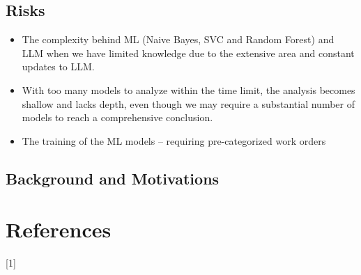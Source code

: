 \documentclass{article}
\begin{document}
\subsection{Risks}

\begin{itemize}
      \item The complexity behind ML (Naive Bayes, SVC and Random Forest) and LLM when
            we have limited knowledge due to the extensive area and constant updates to LLM.
      \item With too many models to analyze within the time limit, the analysis becomes
            shallow and lacks depth, even though we may require a substantial number of models
            to reach a comprehensive conclusion.
      \item The training of the ML models -- requiring pre-categorized work orders
\end{itemize}

\subsection{Background and Motivations}

\section{References}

 [1]
\end{document}
